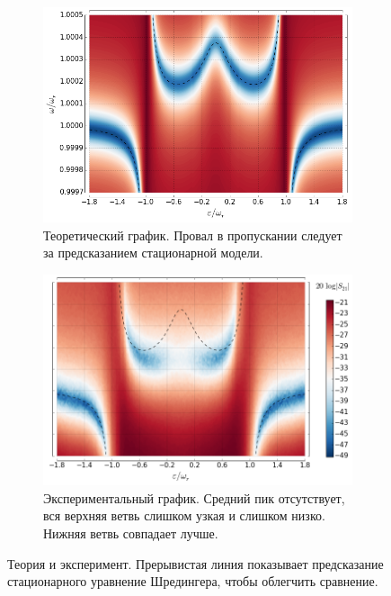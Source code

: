 \documentclass[12pt, twoside]{report}
\numberwithin{equation}{section}
\numberwithin{figure}{section}
\begin{document}
\begin{figure}[h]
\begingroup
\captionsetup[subfigure]{justification=normal, width=0.9\textwidth}
\centering
\begin{subfigure}[t]{0.49\textwidth}
\centering
\includegraphics[height=0.24\textheight]{Pictures/anticrossing_double1}
\caption{Теоретический график. Провал в пропускании следует за предсказанием стационарной модели.}
\end{subfigure}
%
\begin{subfigure}[t]{0.49\textwidth}
\centering
\includegraphics[height=0.24\textheight]{Pictures/anticrossing_double2}
\caption{Экспериментальный график. Средний пик отсутствует, вся верхняя ветвь слишком узкая и слишком низко. Нижняя ветвь совпадает лучше.}
\end{subfigure}
\caption{Теория и эксперимент. Прерывистая линия показывает предсказание стационарного уравнение Шредингера, чтобы облегчить сравнение.}
\label{fig:anticrossing}
\endgroup
\end{figure}
\end{document}
